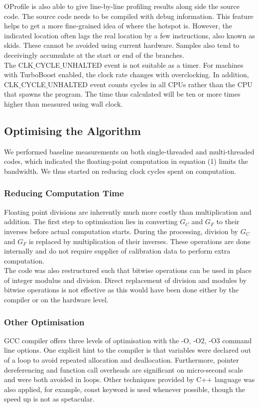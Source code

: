 \documentclass[journal]{IEEEtran}
\begin{document}
OProfile is also able to give line-by-line profiling results along side the source code. The source code needs to be compiled with debug information. This feature helps to get a more fine-grained idea of where the hotspot is. However, the indicated location often lags the real location by a few instructions, also known as skids. These cannot be avoided using current hardware. Samples also tend to deceivingly accumulate at the start or end of the branches. \\

The CLK$\_$CYCLE$\_$UNHALTED event is not suitable as a timer. For machines with TurboBoost enabled, the clock rate changes with overclocking. In addition, CLK$\_$CYCLE$\_$UNHALTED event counts cycles in all CPUs rather than the CPU that spawns the program. The time thus calculated will be ten or more times higher than measured using wall clock.

\subsection{Optimising the Algorithm}
\label{sec:optimisation}
We performed baseline measurements on both single-threaded and multi-threaded codes, which indicated the floating-point computation in equation (1) limits the bandwidth. We thus started on reducing clock cycles spent on computation.
\subsubsection{Reducing Computation Time}
Floating point divisions are inherently much more costly than multiplication and addition. The first step to optimisation lies in converting $G_C$ and $G_F$ to their inverses before actual computation starts. During the processing, division by $G_C$ and $G_F$ is replaced by multiplication of their inverses. These operations are done internally and do not require supplier of calibration data to perform extra computation.\\
The code was also restructured such that bitwise operations can be used in place of integer modulus and division. Direct replacement of division and modules by bitwise operations is not effective as this would have been done either by the compiler or on the hardware level.\\

\subsubsection{Other Optimisation}
GCC compiler offers three levels of optimisation with the -O, -O2, -O3 command line options\cite{gcc}. One explicit hint to the compiler is that variables were declared out of a loop to avoid repeated allocation and deallocation. Furthermore, pointer dereferencing and function call overheads are significant on micro-second scale and were both avoided in loops. Other techniques provided by C++ language was also applied, for example, const keyword is used whenever possible, though the speed up is not as spetacular. 
\end{document}
